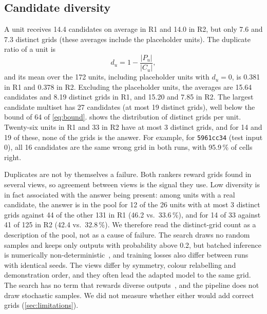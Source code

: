 \documentclass[11pt]{article}
\newcommand{\code}[1]{\texttt{#1}}
\newcommand{\R}[1]{R#1}
\begin{document}
\subsection{Candidate diversity}
\label{sec:diversity}

A unit receives 14.4 candidates on average in \R{1} and 14.0 in \R{2}, but only 7.6 and 7.3 distinct grids (these averages include the placeholder units). The duplicate ratio of a unit is
\begin{equation}
\label{eq:dup}
d_u = 1 - \frac{|P_u|}{|C_u|} ,
\end{equation}
and its mean over the 172 units, including placeholder units with $d_u = 0$, is 0.381 in \R{1} and 0.378 in \R{2}.
Excluding the placeholder units, the averages are 15.64 candidates and 8.19 distinct grids in \R{1}, and 15.20 and 7.85 in \R{2}. The largest candidate multiset has 27 candidates (at most 19 distinct grids), well below the bound of 64 of \cref{eq:bound}.
 shows the distribution of distinct grids per unit. Twenty-six units in \R{1} and 33 in \R{2} have at most 3 distinct grids, and for 14 and 19 of these, none of the grids is the answer.
For example, for \code{5961cc34} (test input 0), all 16 candidates are the same wrong grid in both runs, with 95.9\,\% of cells right.

Duplicates are not by themselves a failure. Both rankers reward grids found in several views, so agreement between views is the signal they use. Low diversity is in fact associated with the answer being present: among units with a real candidate, the answer is in the pool for 12 of the 26 units with at most 3 distinct grids against 44 of the other 131 in \R{1} (46.2 vs.\ 33.6\,\%), and for 14 of 33 against 41 of 125 in \R{2} (42.4 vs.\ 32.8\,\%). We therefore read the distinct-grid count as a description of the pool, not as a cause of failure.
The search draws no random samples and keeps only outputs with probability above 0.2, but batched inference is numerically non-deterministic~\citep{nvarc2025,he2025nondeterminism}, and training losses also differ between runs with identical seeds. The views differ by symmetry, colour relabelling and demonstration order, and they often lead the adapted model to the same grid.
The search has no term that rewards diverse outputs~\citep[cf.][]{vijayakumar2016diverse}, and the pipeline does not draw stochastic samples. We did not measure whether either would add correct grids (\cref{sec:limitations}).
\end{document}
